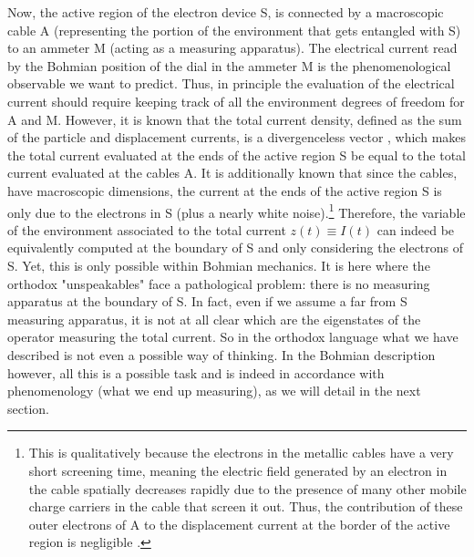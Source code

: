 \documentclass[11pt, a4paper]{article} %
\begin{document}
Now, the active region of the electron device S, is connected by a macroscopic cable A (representing the portion of the environment that gets entangled with S) to an ammeter M (acting as a measuring apparatus). The electrical current read by the Bohmian position of the dial in the ammeter M is the phenomenological observable we want to predict. Thus, in principle the evaluation of the electrical current should require keeping track of all the environment degrees of freedom for A and M. However, it is known that the total current density, defined as the sum of the particle and displacement currents, is a divergenceless vector \cite{diver1, diver2}, which makes the total current evaluated at the ends of the active region S be equal to the total current evaluated at the cables A. It is additionally known \cite{equiv} that since the cables, have macroscopic dimensions, the current at the ends of the active region S is only due to the electrons in S (plus a nearly white noise).\footnote{This is qualitatively because the electrons in the metallic cables have a very short screening time, meaning the electric field generated by an electron in the cable spatially decreases rapidly due to the presence of many other mobile charge carriers in the cable that screen it out. Thus, the contribution of these outer electrons of A to the displacement current at the border of the active region is negligible \cite{neg}.} Therefore, the variable of the environment associated to the total current $z(t)\equiv I(t)$ can indeed be equivalently computed at the boundary of S and only considering the electrons of S. Yet, this is only possible within Bohmian mechanics. It is here where the orthodox "unspeakables" face a pathological problem: there is no measuring apparatus at the boundary of S. In fact, even if we assume a far from S measuring apparatus, it is not at all clear which are the eigenstates of the operator measuring the total current. So in the orthodox language what we have described is not even a possible way of thinking. In the Bohmian description however, all this is a possible task and is indeed in accordance with phenomenology (what we end up measuring), as we will detail in the next section.
\end{document}
